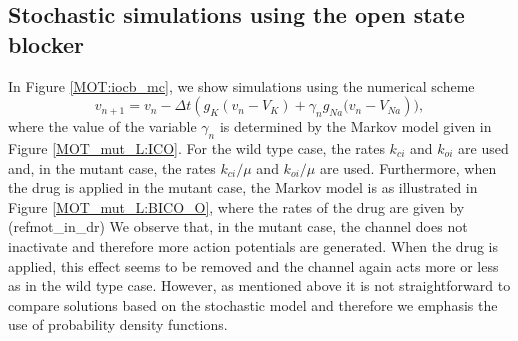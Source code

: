 
\subsection{Stochastic simulations using the open state blocker}

In Figure \ref{MOT:iocb_mc}, we show simulations using the numerical scheme
\begin{equation}
v_{n+1}=v_{n}-\Delta t\left(  g_{K}\left(  v_{n}-V_{K}\right)  +\gamma
_{n}g_{Na}(v_{n}-V_{Na}\right)  ), \label{s1000}
\end{equation}
where the value of the variable $\gamma_{n}$ 
is determined by the Markov model given in
Figure \ref{MOT_mut_L:ICO}. For the wild type case, the rates $k_{ci}$ and $k_{oi}$
are used and, in the mutant case, the rates $k_{ci}/\mu$ and $k_{oi}
/\mu$ are used. Furthermore, when the drug is applied in the mutant case, the Markov
model is as illustrated in Figure \ref{MOT_mut_L:BICO_O}, where the rates of
the drug are given by (ref{mot_in_dr}) We observe that, in the
mutant case, the channel does not inactivate and therefore more action
potentials are generated. When the drug is applied, this effect seems to be removed and
the channel again acts more or less as in the wild type case. However, as mentioned above
it is not straightforward to compare solutions based on the stochastic model and therefore we emphasis
the use of probability density functions. 

